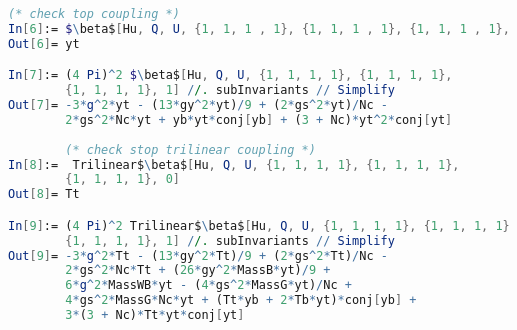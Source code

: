 \documentclass{scrartcl}
\begin{document}
\begin{lstlisting}[language=mathematica,mathescape,columns=flexible,backgroundcolor=\color{light-gray}]
        (* check top coupling *)
In[6]:= $\beta$[Hu, Q, U, {1, 1, 1 , 1}, {1, 1, 1 , 1}, {1, 1, 1 , 1}, 0]
Out[6]= yt

In[7]:= (4 Pi)^2 $\beta$[Hu, Q, U, {1, 1, 1, 1}, {1, 1, 1, 1}, 
        {1, 1, 1, 1}, 1] //. subInvariants // Simplify
Out[7]= -3*g^2*yt - (13*gy^2*yt)/9 + (2*gs^2*yt)/Nc - 
        2*gs^2*Nc*yt + yb*yt*conj[yb] + (3 + Nc)*yt^2*conj[yt]
        
        (* check stop trilinear coupling *)
In[8]:=  Trilinear$\beta$[Hu, Q, U, {1, 1, 1, 1}, {1, 1, 1, 1}, 
        {1, 1, 1, 1}, 0]
Out[8]= Tt

In[9]:= (4 Pi)^2 Trilinear$\beta$[Hu, Q, U, {1, 1, 1, 1}, {1, 1, 1, 1}, 
        {1, 1, 1, 1}, 1] //. subInvariants // Simplify
Out[9]= -3*g^2*Tt - (13*gy^2*Tt)/9 + (2*gs^2*Tt)/Nc - 
        2*gs^2*Nc*Tt + (26*gy^2*MassB*yt)/9 + 
        6*g^2*MassWB*yt - (4*gs^2*MassG*yt)/Nc + 
        4*gs^2*MassG*Nc*yt + (Tt*yb + 2*Tb*yt)*conj[yb] + 
        3*(3 + Nc)*Tt*yt*conj[yt]

\end{lstlisting}
\newpage
\printbibliography
\end{document}
